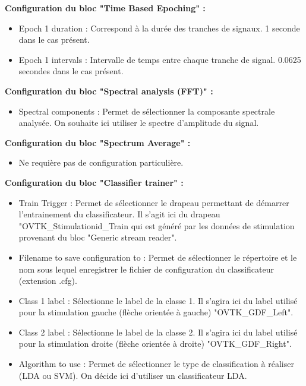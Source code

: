 \smallbreak
\textbf{Configuration du bloc "Time Based Epoching" : }
\smallbreak
\begin{itemize}
	\item Epoch 1 duration : Correspond à la durée des tranches de signaux. 1 seconde dans le cas présent.
	\smallbreak
	\item Epoch 1 intervals : Intervalle de temps entre chaque tranche de signal. 0.0625 secondes dans le cas présent. 
\end{itemize}

\smallbreak
\textbf{Configuration du bloc "Spectral analysis (FFT)" : }
\smallbreak
\begin{itemize}
	\item Spectral components : Permet de sélectionner la composante spectrale analysée. On souhaite ici utiliser le spectre d'amplitude du signal. 
\end{itemize}

\smallbreak
\textbf{Configuration du bloc "Spectrum Average" : }
\smallbreak
\begin{itemize}
	\item Ne requière pas de configuration particulière.
\end{itemize}

\smallbreak
\textbf{Configuration du bloc "Classifier trainer" : }
\smallbreak
\begin{itemize}
	\item Train Trigger : Permet de sélectionner le drapeau permettant de démarrer l'entrainement du classificateur. Il s'agit ici du drapeau "OVTK\_Stimulationid\_Train qui est généré par les données de stimulation provenant du bloc "Generic stream reader".
	\smallbreak
	\item Filename to save configuration to : Permet de sélectionner le répertoire et le nom sous lequel enregistrer le fichier de configuration du classificateur (extension .cfg).
	\smallbreak
	\item Class 1 label : Sélectionne le label de la classe 1. Il s'agira ici du label utilisé pour la stimulation gauche (flèche orientée à gauche) "OVTK\_GDF\_Left".
	\smallbreak
	\item Class 2 label : Sélectionne le label de la classe 2. Il s'agira ici du label utilisé pour la stimulation droite (flèche orientée à droite) "OVTK\_GDF\_Right".
	\smallbreak 
	\item Algorithm to use : Permet de sélectionner le type de classification à réaliser (LDA ou SVM). On décide ici d'utiliser un classificateur LDA.
\end{itemize}

